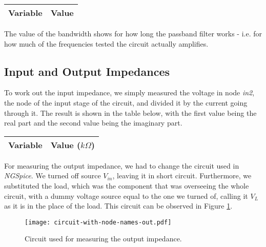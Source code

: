 \begin{center}
\begin{tabular}{|l|r|}
  \hline    
  {\bf Variable} & {\bf Value} \\ \hline
  
\end{tabular}
\end{center}

\vspace{0.4cm}

The value of the bandwidth shows for how long the passband filter works - i.e. for how much of the frequencies tested the circuit actually amplifies.


\newpage
\subsection{Input and Output Impedances}

To work out the input impedance, we simply measured the voltage in node \textit{in2}, the node of the input stage of the circuit, and divided it by the current going through it. The result is shown in the table below, with the first value being the real part and the second value being the imaginary part.

\vspace{0.4cm}

\begin{center}
\begin{tabular}{|l|r|}
  \hline    
  {\bf Variable} & {\bf Value ($k\Omega$)} \\ \hline
  
\end{tabular}
\end{center}

\vspace{0.4cm}

For measuring the output impedance, we had to change the circuit used in \textit{NGSpice}. We turned off source $V_{in}$, leaving it in short circuit. Furthermore, we substituted the load, which was the component that was overseeing the whole circuit, with a dummy voltage source equal to the one we turned of, calling it $V_L$ as it is in the place of the load. This circuit can be observed in Figure \ref{fig:circuit-2-spice}.

\vspace{0.4cm}


\begin{figure}[h] \centering
\texttt{[image: circuit-with-node-names-out.pdf]}
\caption{Circuit used for measuring the output impedance.}
\label{fig:circuit-2-spice}
\end{figure}

